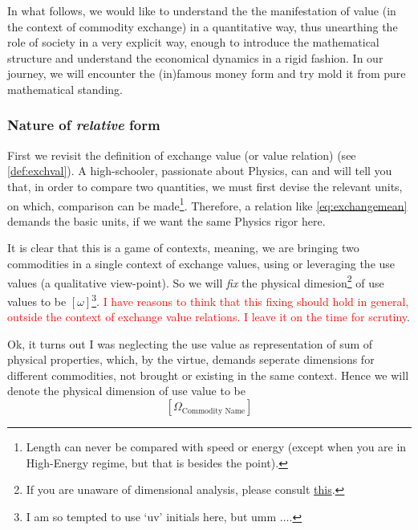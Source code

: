 \documentclass[12pt]{extarticle}
\theoremstyle{definition}
\begin{document}
In what follows, we would like to understand the the manifestation of value (in the context of commodity exchange) in a quantitative way, thus unearthing the role of society in a very explicit way, enough to introduce the mathematical structure and understand the economical dynamics in a rigid fashion.  In our journey, we will encounter the (in)famous money form and try mold it from pure mathematical standing.

\subsubsection{Nature of \emph{relative} form}
First we revisit the definition of exchange value (or value relation) (see \ref{def:exchval}).  A high-schooler, passionate about Physics, can and will tell you that, in order to compare two quantities, we must first devise the relevant units, on which, comparison can be made\footnote{Length can never be compared with speed or energy (except when you are in High-Energy regime, but that is besides the point).}.  Therefore, a relation like \ref{eq:exchangemean} demands the basic units, if we want the same Physics rigor here.

It is clear that this is a game of contexts, meaning, we are bringing two commodities in a single context of exchange values, using or leveraging the use values (a qualitative view-point).  So we will \emph{fix} the physical dimesion\footnote{If you are unaware of dimensional analysis, please consult \href{https://en.wikipedia.org/wiki/Dimensional_analysis}{this}.} of use values to be $[\omega]$\footnote{I am so tempted to use `uv' initials here, but umm $\ldots$.}.  \textcolor{red}{I have reasons to think that this fixing should hold in general, outside the context of exchange value relations.  I leave it on the time for scrutiny}.

Ok, it turns out I was neglecting the use value as representation of sum of physical properties, which, by the virtue, demands seperate dimensions for different commodities, not brought or existing in the same context.  Hence we will denote the physical dimension of use value to be
\begin{equation}
  \label{eq:usevaldim}
  \left[\Omega_{\text{Commodity Name}}\right]
\end{equation}
\end{document}
